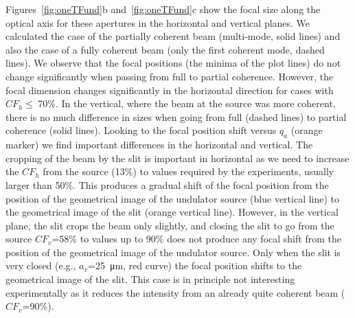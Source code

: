 \documentclass[9pt,twocolumn,twoside]{osajnl}
\begin{document}
Figures~\ref{fig:oneTFund}b and~\ref{fig:oneTFund}c show the focal size along the optical axis for these apertures in the horizontal and vertical planes. We calculated the case of the partially coherent beam (multi-mode, solid lines) and also the case of a fully coherent beam (only the first coherent mode, dashed lines). We observe that the focal positions (the minima of the plot lines) do not change significantly when passing from full to partial coherence. However, the focal dimension changes significantly in the horizontal direction for cases with $CF_h\le~$70\%. In the vertical, where the beam at the source was more coherent, there is no much difference in sizes when going from full (dashed lines) to partial coherence (solid lines). Looking to the focal position shift versus $q_a$ (orange marker) we find important differences in the horizontal and vertical. The cropping of the beam by the slit is important in horizontal as we need to increase the $CF_h$ from the source (13\%) to values required by the experiments, usually larger than 50\%. This produces a gradual shift of the focal position from the position of the geometrical image of the undulator source (blue vertical line) to the geometrical image of the slit (orange vertical line). However, in the vertical plane, the slit crops the beam only slightly, and closing the slit to go from the source $CF_v$=58\% to values up to 90\% does not produce any focal shift from the position of the geometrical image of the undulator source. Only when the slit is very closed (e.g., $a_v$=\SI{25}{\micro\meter}, red curve) the focal position shifts to the geometrical image of the slit. This case is in principle not interesting experimentally as it reduces the intensity from an already quite coherent beam ($CF_v$=90\%).
\end{document}
